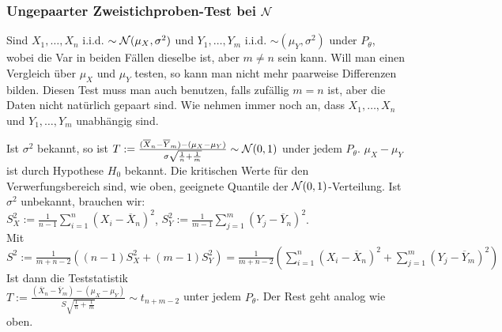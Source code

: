 \subsubsection{Ungepaarter Zweistichproben-Test bei $\mathcal{N}$}
Sind $X_1, \dots, X_n$ i.i.d. $\sim \mathcal{N}(\mu_X, \sigma^2)$ und $Y_1, \dots, Y_m$ i.i.d. $\sim(\mu_Y, \sigma^2)$ under $P_\theta$, wobei die Var in beiden Fällen dieselbe ist, aber $m \neq n$ sein kann. Will man einen Vergleich über $\mu_X$ und $\mu_Y$ testen, so kann man nicht mehr paarweise Differenzen bilden. Diesen Test muss man auch benutzen, falls zufällig $m = n$ ist, aber die Daten nicht natürlich gepaart sind. Wie nehmen immer noch an, dass $X_1, \dots, X_n$ und $Y_1, \dots, Y_m$ unabhängig sind.
\begin{itemize}
     Ist $\sigma^2$ bekannt, so ist $T := \frac{(\overline{X}_n - \overline{Y}_m) - (\mu_X - \mu_Y)}{\sigma \sqrt{\frac{1}{n} + \frac{1}{m}}} \sim \mathcal{N}(0, 1)$ under jedem $P_\theta$. $\mu_X - \mu_Y$ ist durch Hypothese $H_0$ bekannt. Die kritischen Werte für den Verwerfungsbereich sind, wie oben, geeignete Quantile der $\mathcal{N}(0, 1)$-Verteilung.
     Ist $\sigma^2$ unbekannt, brauchen wir: \\
    $S_X^2:= \frac{1}{n - 1} \sum_{i=1}^{n}(X_i - \overline{X}_n)^2$,
    $S_Y^2:= \frac{1}{m - 1} \sum_{j=1}^{m}(Y_j - \overline{Y}_n)^2$. \\
    Mit $S^2 := \frac{1}{m + n - 2}((n - 1)S_X^2 + (m - 1)S_Y^2) = \frac{1}{m + n - 2} (\sum_{i=1}^{n} (X_i - \overline{X}_n)^2 + \sum_{j=1}^{m}(Y_j - \overline{Y}_m)^2)$\\
   Ist dann die Teststatistik\\
   $T := \frac{(\overline{X}_n - \overline{Y}_m) - (\mu_X - \mu_Y)}{S \sqrt{\frac{1}{n} + \frac{1}{m}}} \sim t_{n + m - 2}$ unter jedem $P_\theta$. Der Rest geht analog wie oben.
\end{itemize}

